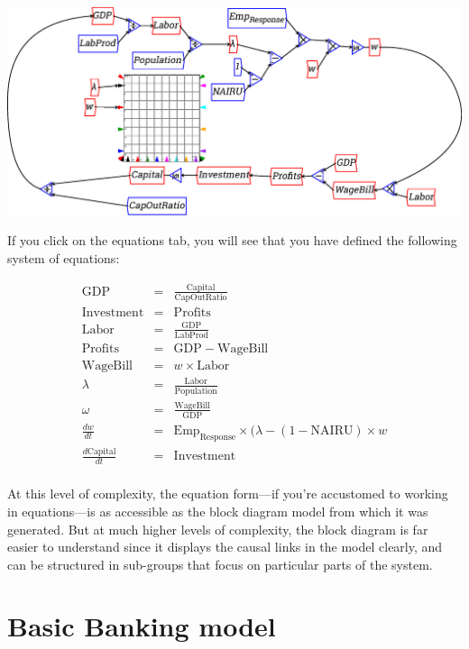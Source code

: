 \begin{center}
\includegraphics{images/NewItem116.eps}
\end{center}

If you click on the equations tab, you will see that you have defined the following system of
equations:

\begin{eqnarray*}
\mathrm{GDP}&=&\frac{\mathrm{Capital}}{\mathrm{CapOutRatio}}\\
\mathrm{Investment}&=&\mathrm{Profits}\\
\mathrm{Labor}&=&\frac{\mathrm{GDP}}{\mathrm{LabProd}}\\
\mathrm{Profits}&=&\mathrm{GDP}-\mathrm{WageBill}\\
\mathrm{WageBill}&=&w\times\mathrm{Labor}\\
\lambda&=&\frac{\mathrm{Labor}}{\mathrm{Population}}\\
\omega&=&\frac{\mathrm{WageBill}}{\mathrm{GDP}}\\
\frac{dw}{dt}&=&\mathrm{Emp}_\mathrm{Response}\times(\lambda-(1-\mathrm{NAIRU})
        \times w\\
\frac{d\mathrm{Capital}}{dt}&=&\mathrm{Investment}\\
\end{eqnarray*}


At this level of complexity, the equation form---if you're accustomed
to working in equations---is as accessible as the block diagram model from
which it was generated. But at much higher levels of complexity, the
block diagram is far easier to understand since it displays the causal
links in the model clearly, and can be structured in sub-groups that
focus on particular parts of the system. 

\section{Basic Banking model}\label{tut:basicBankModel}

